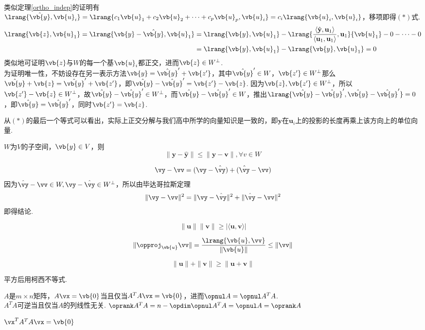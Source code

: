 \begin{analysis}
类似定理\ref{ortho_indep}的证明有$\lrang{\hat{\vb{y}},\vb{u}_i}=\lrang{c_1\vb{u}_1+c_2\vb{u}_2+\cdots+c_p\vb{u}_p,\vb{u}_i}=c_i\lrang{\vb{u}_i,\vb{u}_i}$，移项即得$(*)$式.
\[\begin{aligned}\lrang{\vb{z},\vb{u}_1}=\lrang{\vb{y}-\hat{\vb{y}},\vb{u}_1}&=\lrang{\vb{y},\vb{u}_1}-\lrang{\frac{\langle \hat{\mathbf{y}},\mathbf{u}_1\rangle}{\langle\mathbf{u}_1,\mathbf{u}_1\rangle},\mathbf{u}_1}{\vb{u}_1}-0-\cdots-0\\
&=\lrang{\vb{y},\vb{u}_1}-\lrang{\vb{y},\vb{u}_1}=0\end{aligned}\]
类似地可证明$\vb{z}$与$W$的每一个基$\vb{u}_i$都正交，进而$\vb{z}\in W^\perp$.\\
为证明唯一性，不妨设存在另一表示方法$\vb{y}=\hat{\vb{y}}'+\vb{z'}$，其中$\hat{\vb{y}}'\in W$，$\vb{z'}\in W^\perp$那么$\hat{\vb{y}}+\vb{z}=\hat{\vb{y}}'+\vb{z'}$，即$\hat{\vb{y}}-\hat{\vb{y}}'=\vb{z'}-\vb{z}$. 因为$\vb{z},\vb{z'}\in W^\perp$，所以$\vb{z'}-\vb{z}\in W^\perp$，故$\hat{\vb{y}}-\hat{\vb{y}}'\in W^\perp$，而$\hat{\vb{y}}-\hat{\vb{y}}'\in W$，推出$\lrang{\hat{\vb{y}}-\hat{\vb{y}}',\hat{\vb{y}}-\hat{\vb{y}}'}=0$，即$\hat{\vb{y}}=\hat{\vb{y}}'$，同时$\vb{z'}=\vb{z}$.
\end{analysis}
\par 从$(*)$的最后一个等式可以看出，实际上正交分解与我们高中所学的向量知识是一致的，即$\mathbf{y}$在$\mathbf{u}_i$上的投影的长度再乘上该方向上的单位向量.
\begin{theorem}[最佳估计]
$W$为$V$的子空间，$\vb{y}\in V$，则
\[\|\mathbf{y}-\hat{\mathbf{y}}\|\leq\|\mathbf{y}-\mathbf{v}\|,\forall v\in W\]
\end{theorem}
\begin{analysis}
\[\vy-\vv=(\vy-\hat{\vy})+(\hat{\vy}-\vv)\]
因为$\hat{\vy}-\vv\in W,\vy-\hat{\vy}\in W^\perp$，所以由毕达哥拉斯定理
\[\|\vy-\vv\|^2=\|\vy-\hat{\vy}\|^2+\|\hat{\vy}-\vv\|^2\]
即得结论.
\end{analysis}
\begin{theorem}
\[\|\mathbf{u}\|\|\mathbf{v}\|\geq|\langle \mathbf{u},\mathbf{v} \rangle|\]
\end{theorem}
\begin{analysis}
\[\|\opproj_{\vb{u}}\vv\|=\dfrac{\lrang{\vb{u},\vv}}{\|\vb{u}\|}\leq\|\vv\|\]
\end{analysis}
\begin{theorem}[三角不等式]
\[\|\mathbf{u}\|+\|\mathbf{v}\|\geq\|\mathbf{u}+\mathbf{v}\|\]
\end{theorem}
\begin{analysis}
平方后用柯西不等式.
\end{analysis}
\begin{proposition}%
$A$是$m\times n$矩阵，$A\vx=\vb{0}$当且仅当$A^TA\vx=\vb{0}$，进而$\opnul A=\opnul A^TA$.\\
$A^TA$可逆当且仅当$A$的列线性无关. $\oprank A^TA=n-\opdim\opnul A^TA=\opnul A=\oprank A$
\end{proposition}
\begin{analysis}
$\vx^TA^TA\vx=\vb{0}$
\end{analysis}

